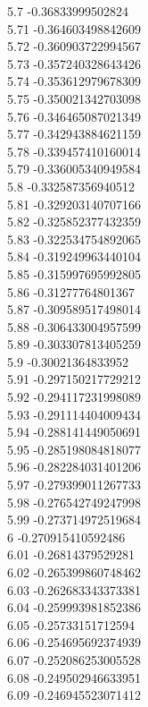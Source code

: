 {5.7	-0.36833999502824\\
5.71	-0.364603498842609\\
5.72	-0.360903722994567\\
5.73	-0.357240328643426\\
5.74	-0.353612979678309\\
5.75	-0.350021342703098\\
5.76	-0.346465087021349\\
5.77	-0.342943884621159\\
5.78	-0.339457410160014\\
5.79	-0.336005340949584\\
5.8	-0.332587356940512\\
5.81	-0.329203140707166\\
5.82	-0.325852377432359\\
5.83	-0.322534754892065\\
5.84	-0.319249963440104\\
5.85	-0.315997695992805\\
5.86	-0.31277764801367\\
5.87	-0.309589517498014\\
5.88	-0.306433004957599\\
5.89	-0.303307813405259\\
5.9	-0.30021364833952\\
5.91	-0.297150217729212\\
5.92	-0.294117231998089\\
5.93	-0.291114404009434\\
5.94	-0.288141449050691\\
5.95	-0.285198084818077\\
5.96	-0.282284031401206\\
5.97	-0.279399011267733\\
5.98	-0.276542749247998\\
5.99	-0.273714972519684\\
6	-0.270915410592486\\
6.01	-0.26814379529281\\
6.02	-0.265399860748462\\
6.03	-0.262683343373381\\
6.04	-0.259993981852386\\
6.05	-0.25733151712594\\
6.06	-0.254695692374939\\
6.07	-0.252086253005528\\
6.08	-0.249502946633951\\
6.09	-0.246945523071412\\
}

